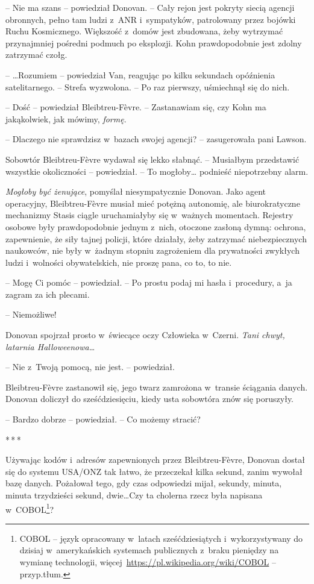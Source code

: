 \documentclass[oneside,polish,11pt,sfheadings]{mwbk}
\newcommand{\threeast}{\bigskip\par\centerline{*\,*\,*}\medskip\par}%
\begin{document}
-- Nie ma szans -- powiedział Donovan. -- Cały rejon jest pokryty siecią
agencji obronnych, pełno tam ludzi z~ANR i~sympatyków, patrolowany przez
bojówki Ruchu Kosmicznego. Większość z~domów jest zbudowana, żeby
wytrzymać przynajmniej pośredni podmuch po eksplozji. Kohn
prawdopodobnie jest zdolny zatrzymać czołg.

-- \ldots Rozumiem -- powiedział Van, reagując po kilku sekundach opóźnienia
satelitarnego. -- Strefa wyzwolona. -- Po raz pierwszy, uśmiechnął się do
nich.

-- Dość -- powiedział Bleibtreu-Fèvre. -- Zastanawiam się, czy Kohn ma
jakąkolwiek, jak mówimy, \emph{formę}.

-- Dlaczego nie sprawdzisz w~bazach swojej agencji? -- zasugerowała pani
Lawson.

Sobowtór Bleibtreu-Fèvre wydawał się lekko słabnąć. -- Musiałbym
przedstawić wszystkie okoliczności -- powiedział. -- To mogłoby\ldots
podnieść niepotrzebny alarm.

\emph{Mogłoby być żenujące}, pomyślał niesympatycznie Donovan. Jako
agent operacyjny, Bleibtreu-Fèvre musiał mieć potężną autonomię, ale
biurokratyczne mechanizmy Stasis ciągle uruchamiałyby się w~ważnych
momentach. Rejestry osobowe były prawdopodobnie jednym z~nich, otoczone
zasłoną dymną: ochrona, zapewnienie, że siły tajnej policji, które
działały, żeby zatrzymać niebezpiecznych naukowców, nie były w~żadnym
stopniu zagrożeniem dla prywatności zwykłych ludzi i~wolności
obywatelskich, nie proszę pana, co to, to nie.

-- Mogę Ci pomóc -- powiedział. -- Po prostu podaj mi hasła i~procedury, a~ja zagram za ich plecami.

-- Niemożliwe!

Donovan spojrzał prosto w~świecące oczy Człowieka w~Czerni. \emph{Tani
chwyt, latarnia Halloweenowa\ldots}

-- Nie z~Twoją pomocą, nie jest. -- powiedział.

Bleibtreu-Fèvre zastanowił się, jego twarz zamrożona w~transie ściągania
danych. Donovan doliczył do sześćdziesięciu, kiedy usta sobowtóra znów
się poruszyły.

-- Bardzo dobrze -- powiedział. -- Co możemy stracić?
  \threeast 

Używając kodów i~adresów zapewnionych przez Bleibtreu-Fèvre, Donovan
dostał się do systemu USA/ONZ tak łatwo, że przeczekał kilka sekund,
zanim wywołał bazę danych. Pożałował tego, gdy czas odpowiedzi mijał,
sekundy, minuta, minuta trzydzieści sekund, dwie\ldots Czy ta cholerna
rzecz była napisana w~COBOL\footnote{COBOL -- język opracowany w~latach
sześćdziesiątych i~wykorzystywany do dzisiaj w~amerykańskich systemach
publicznych z~braku pieniędzy na wymianę technologii,
więcej~\url{https://pl.wikipedia.org/wiki/COBOL} -- przyp.tłum.}? 
\end{document}
